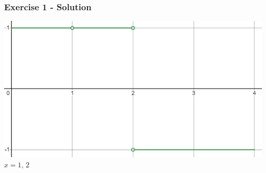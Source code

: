 \documentclass[12pt]{beamer}
\begin{document}
\begin{frame}
	\frametitle{Exercise 1 - Solution}

	\begin{center}
		\includegraphics[scale=0.6]{exercise_1_solution_graph.png}
		\vfill
		$\boxed{x=1\text{, }2}$
	\end{center}
\end{frame}
\end{document}
